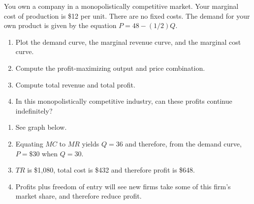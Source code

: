 \begin{enumialphparenastyle}
\begin{ex}\label{ex:ch11ex2}
You own a company in a monopolistically competitive market. Your marginal cost of production is \$12 per unit. There are no fixed costs. The demand for your own product is given by the equation $P=48-(1/2)Q$.
\begin{enumerate}
	\item	Plot the demand curve, the marginal revenue curve, and the marginal cost curve.
	\item	Compute the profit-maximizing output and price combination.
	\item	Compute total revenue and total profit.
	\item	In this monopolistically competitive industry, can these profits continue indefinitely?
\end{enumerate}
\begin{sol}
\begin{enumerate}
	\item	See graph below.
	\item	Equating $MC$ to $MR$ yields $Q=36$ and therefore, from the demand curve, $P=\$30$ when $Q=30$.
	\item	$TR$ is \$1,080, total cost is \$432 and therefore profit is \$648.
	\item	Profits plus freedom of entry will see new firms take some of this firm's market share, and therefore reduce profit.
\end{enumerate}
\begin{center}
\end{center}
\end{sol}
\end{ex}


\end{enumialphparenastyle}
